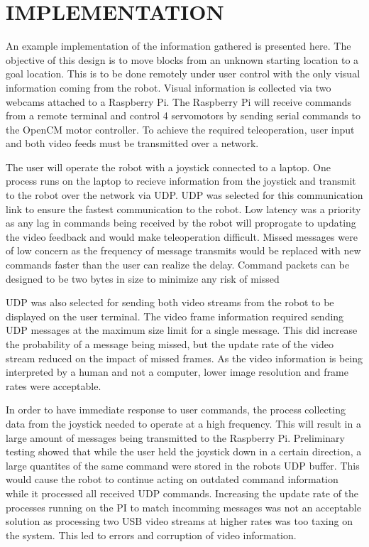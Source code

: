 \section{IMPLEMENTATION}

An example implementation of the information gathered is presented here. The objective of this design is to move blocks from an unknown starting location to a goal location. This is to be done remotely under user control with the only visual information coming from the robot. Visual information is collected via two webcams attached to a Raspberry Pi. The Raspberry Pi will receive commands from a remote terminal and control 4 servomotors by sending serial commands to the OpenCM motor controller. To achieve the required teleoperation, user input and both video feeds must be transmitted over a network.

The user will operate the robot with a joystick connected to a laptop. One process runs on the laptop to recieve information from the joystick and transmit to the robot over the network via UDP. UDP was selected for this communication link to ensure the fastest communication to the robot. Low latency was a priority as any lag in commands being received by the robot will proprogate to updating the video feedback and would make teleoperation difficult. Missed messages were of low concern as the frequency of message transmits would be replaced with new commands faster than the user can realize the delay. Command packets can be designed to be two bytes in size to minimize any risk of missed 

UDP was also selected for sending both video streams from the robot to be displayed on the user terminal. The video frame information required sending UDP messages at the maximum size limit for a single message. This did increase the probability of a message being missed, but the update rate of the video stream reduced on the impact of missed frames. As the video information is being interpreted by a human and not a computer, lower image resolution and frame rates were acceptable.

In order to have immediate response to user commands, the process collecting data from the joystick needed to operate at a high frequency. This will result in a large amount of messages being transmitted to the Raspberry Pi. Preliminary testing showed that while the user held the joystick down in a certain direction, a large quantites of the same command were stored in the robots UDP buffer. This would cause the robot to continue acting on outdated command information while it processed all received UDP commands. Increasing the update rate of the processes running on the PI to match incomming messages was not an acceptable solution as processing two USB video streams at higher rates was too taxing on the system. This led to errors and corruption of video information.

